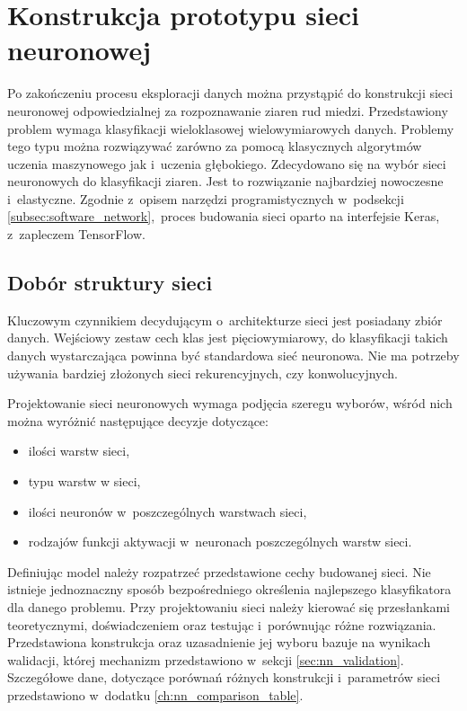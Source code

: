 \section{Konstrukcja prototypu sieci neuronowej}
Po zakończeniu procesu eksploracji danych można przystąpić do konstrukcji sieci
neuronowej odpowiedzialnej za rozpoznawanie ziaren rud miedzi.
Przedstawiony problem wymaga klasyfikacji wieloklasowej wielowymiarowych danych.
Problemy tego typu można rozwiązywać zarówno za pomocą klasycznych algorytmów
uczenia maszynowego jak i~uczenia głębokiego.
Zdecydowano się na wybór sieci neuronowych do klasyfikacji ziaren.
Jest to rozwiązanie najbardziej nowoczesne i~elastyczne.
Zgodnie z~opisem narzędzi programistycznych w~podsekcji
\ref{subsec:software_network},~proces budowania sieci oparto na interfejsie
Keras, z~zapleczem TensorFlow.

\subsection{Dobór struktury sieci}
\label{subsec:nn_build}
Kluczowym czynnikiem decydującym o~architekturze sieci jest posiadany zbiór
danych.
Wejściowy zestaw cech klas jest pięciowymiarowy, do klasyfikacji takich danych
wystarczająca powinna być standardowa sieć neuronowa.
Nie ma potrzeby używania bardziej złożonych sieci rekurencyjnych, czy
konwolucyjnych.

Projektowanie sieci neuronowych wymaga podjęcia szeregu wyborów, wśród nich
można wyróżnić następujące decyzje dotyczące:
\begin{itemize}
    \item ilości warstw sieci,
    \item typu warstw w sieci,
    \item ilości neuronów w~poszczególnych warstwach sieci,
    \item rodzajów funkcji aktywacji w~neuronach poszczególnych warstw sieci.
\end{itemize}
Definiując model należy rozpatrzeć przedstawione cechy budowanej sieci.
Nie istnieje jednoznaczny sposób bezpośredniego określenia najlepszego
klasyfikatora dla danego problemu.
Przy projektowaniu sieci należy kierować się przesłankami teoretycznymi,
doświadczeniem oraz testując i~porównując różne rozwiązania.
Przedstawiona konstrukcja oraz uzasadnienie jej wyboru bazuje na wynikach
walidacji, której mechanizm przedstawiono w~sekcji \ref{sec:nn_validation}.~%
Szczegółowe dane, dotyczące porównań różnych konstrukcji i~parametrów sieci
przedstawiono w~dodatku \ref{ch:nn_comparison_table}.

